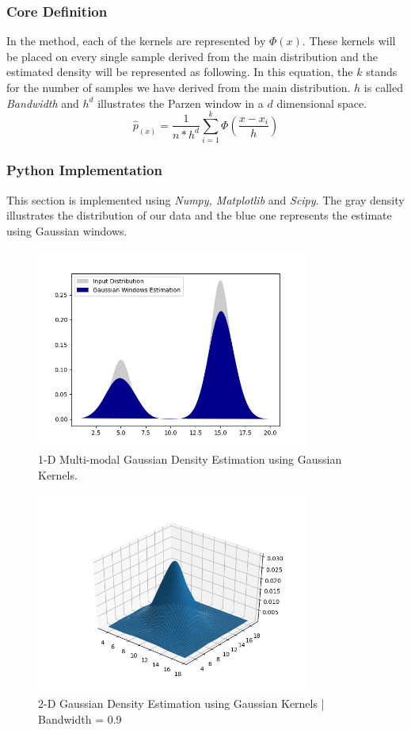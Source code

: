 \documentclass[12pt]{article}
\numberwithin{equation}{section}
\numberwithin{table}{section}
\numberwithin{figure}{section}
\begin{document}
\subsubsection*{Core Definition}
In the method, each of the kernels are represented by $\Phi(x)$. These kernels will be placed on every single sample derived from the main distribution and the estimated density will be represented as following. In this equation, the $k$ stands for the number of samples we have derived from the main distribution. $h$ is called \textit{Bandwidth} and $h^d$ illustrates the Parzen window in a $d$ dimensional space.
\begin{equation}
	\hat{p}_{(x)} = \frac{1}{n*h^d} \sum_{i = 1}^{k}\Phi(\frac{x - x_i}{h})
\end{equation}
\subsubsection*{Python Implementation}
This section is implemented using \textit{Numpy, Matplotlib} and \textit{Scipy}. The gray density illustrates the distribution of our data and the blue one represents the estimate using Gaussian windows.
	\begin{figure}[!h]\centering
	\includegraphics[width=0.8\textwidth]{3_b_1.PNG}
	\caption{1-D Multi-modal Gaussian Density Estimation using Gaussian Kernels.}
	\label{pl1}
\end{figure}

	\begin{figure}[!h]\centering
	\includegraphics[width=0.8\textwidth]{3_b_2.PNG}
	\caption{2-D Gaussian Density Estimation using Gaussian Kernels | Bandwidth = 0.9}
	\label{pl1}
\end{figure}
\end{document}
